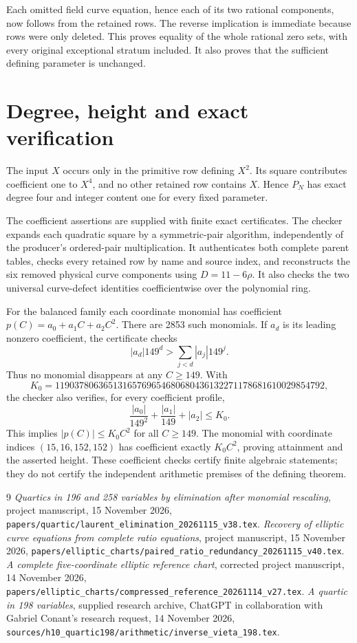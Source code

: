 \documentclass[11pt,a4paper]{article}
\begin{document}
Each omitted field curve equation, hence each of its two rational
components, now follows from the retained rows. The reverse implication
is immediate because rows were only deleted. This proves equality of
the whole rational zero sets, with every original exceptional stratum
included. It also proves that the sufficient defining parameter is
unchanged.

\section{Degree, height and exact verification}
The input $X$ occurs only in the primitive row defining $X^2$.
Its square contributes coefficient one to $X^4$, and no other retained
row contains $X$. Hence $P_N$ has exact degree four and integer content
one for every fixed parameter.

The coefficient assertions are supplied with finite exact certificates.
The checker expands each quadratic square by a symmetric-pair algorithm,
independently of the producer's ordered-pair multiplication. It authenticates
both complete parent tables, checks every retained row by name and source
index, and reconstructs the six removed physical curve components using
$D=11-6\rho$. It also checks the two universal curve-defect identities
coefficientwise over the polynomial ring.

For the balanced family each coordinate monomial has coefficient
$p(C)=a_0+a_1C+a_2C^2$. There are 2853 such monomials. If $a_d$ is its
leading nonzero coefficient, the certificate checks
\[
 |a_d|149^d>\sum_{j<d}|a_j|149^j.
\]
Thus no monomial disappears at any $C\ge149$. With
\[
 K_0=11903780636513165769654680680436132271178681610029854792,
\]
the checker also verifies, for every coefficient profile,
\[
 \frac{|a_0|}{149^2}+\frac{|a_1|}{149}+|a_2|\le K_0.
\]
This implies $|p(C)|\le K_0 C^2$ for all $C\ge149$.
The monomial with coordinate indices $(15,16,152,152)$ has coefficient
exactly $K_0C^2$, proving attainment and the asserted height.
These coefficient checks certify finite algebraic statements; they do
not certify the independent arithmetic premises of the defining theorem.

\begin{thebibliography}{9}
\emph{Quartics in 196 and 258 variables by elimination
after monomial rescaling}, project manuscript, 15 November 2026,
\nolinkurl{papers/quartic/laurent_elimination_20261115_v38.tex}.
\emph{Recovery of elliptic curve equations from complete ratio equations}, project manuscript, 15 November 2026,
\nolinkurl{papers/elliptic_charts/paired_ratio_redundancy_20261115_v40.tex}.
\emph{A complete five-coordinate elliptic reference
chart}, corrected project manuscript, 14 November 2026,
\nolinkurl{papers/elliptic_charts/compressed_reference_20261114_v27.tex}.
\emph{A quartic in 198 variables}, supplied research
archive, ChatGPT in collaboration with Gabriel Conant's research request,
14 November 2026,
\nolinkurl{sources/h10_quartic198/arithmetic/inverse_vieta_198.tex}.
\end{thebibliography}
\end{document}
